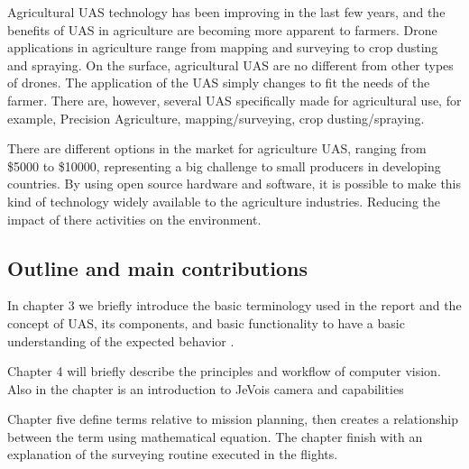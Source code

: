
Agricultural UAS technology has been improving in the last few years, and the benefits of UAS in agriculture are becoming more apparent to farmers. Drone applications in agriculture range from mapping and surveying to crop dusting and spraying. On the surface, agricultural UAS are no different from other types of drones. The application of the UAS simply changes to fit the needs of the farmer. There are, however, several UAS specifically made for agricultural use, for example, Precision Agriculture, mapping/surveying, crop dusting/spraying. 

There are different options in the market for agriculture UAS, ranging from \$5000 to \$10000, representing a big challenge to small producers in developing countries. By using open source hardware and software, it is possible to make this kind of technology widely available to the agriculture industries. Reducing the impact of there activities on the environment.

\subsection{Outline and main contributions}
In chapter 3 we briefly introduce the basic terminology used in the report and the concept of UAS, its components, and basic functionality to have a basic understanding of the expected behavior .

Chapter 4 will briefly describe the principles and workflow of computer vision. Also in the chapter is an introduction to JeVois camera and capabilities

Chapter five define terms relative to mission planning, then creates a relationship between the term using mathematical equation.  The chapter finish with an explanation of the surveying routine executed in the flights.